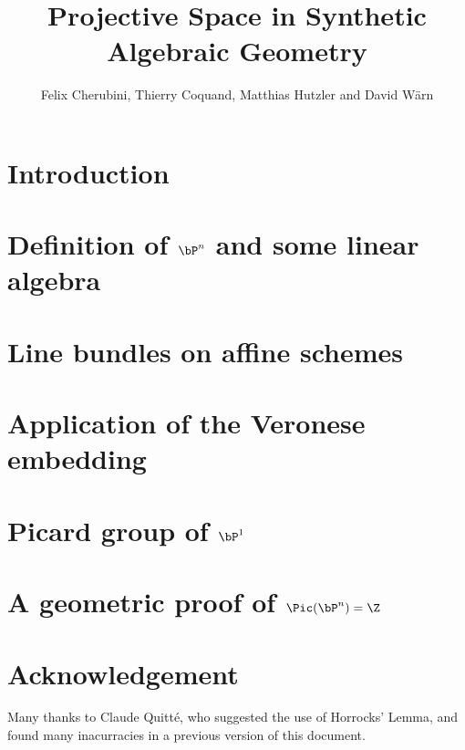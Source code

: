 \documentclass{../util/zariski-small}
\title{Projective Space in Synthetic Algebraic Geometry}
\begin{document}
\author{Felix Cherubini, Thierry Coquand, Matthias Hutzler and David Wärn}

\maketitle

\section*{Introduction}


\section[Definition of projective space and some linear algebra]{Definition of $\bP^n$ and some linear algebra}


%

\section{Line bundles on affine schemes}


\section{Application of the Veronese embedding}


\section[Picard group of projective space]{Picard group of $\bP^1$}


\section[Picard group of projective space (geometric)]{A geometric proof of $\Pic(\bP^n)=\Z$}
\label{geometric-proof}


\section*{Acknowledgement}

Many thanks to Claude Quitt\'e, who suggested the use of Horrocks' Lemma, and found many
inacurracies in a previous version of this document.


\newpage



\printindex

\printbibliography
\end{document}
